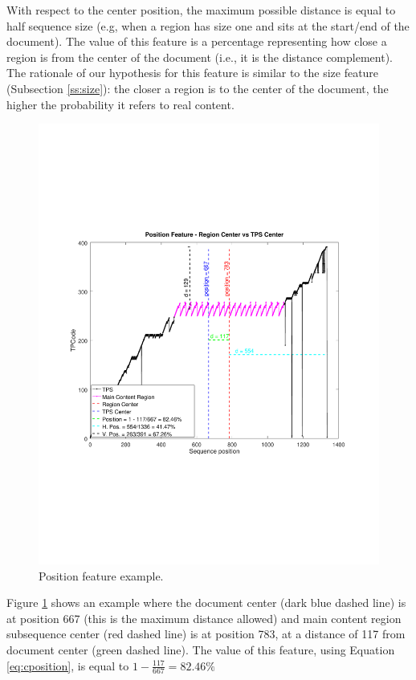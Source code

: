 With respect to the center position, the maximum possible distance is equal to
half sequence size (e.g, when a region has size one and sits at the start/end of
the document). The value of this feature is a percentage representing how close
a region is from the center of the document (i.e., it is the distance
complement). The rationale of our hypothesis for this feature is similar to the
size feature (Subsection \ref{ss:size}): the closer a region is to the center of the
document, the higher the probability it refers to real content.

\begin{figure}[h]
  \centering
     \includegraphics[trim={2.0cm 7.0cm 2.2cm 7.4cm}, clip,  width=\columnwidth]{img/position.pdf}
  \caption{Position feature example.}
  \label{fig:position}
\end{figure}

Figure \ref{fig:position} shows an example where the document center (dark blue
dashed line) is at position 667 (this is the maximum distance allowed) and main
content region subsequence center (red dashed line) is at position 783, at a
distance of 117 from document center (green dashed line). The value of this
feature, using Equation \ref{eq:cposition}, is equal to $1- \frac{117}{667} = 82.46\%$

